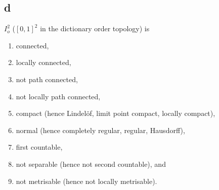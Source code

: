 
\subsection*{d}
  $I_o^2$ ($[0,1]^2$ in the dictionary order topology) is
  \begin{enumerate}
  \item connected,
  \item locally connected,
  \item not path connected,
  \item not locally path connected,
  \item compact (hence Lindel\"of, limit point compact, locally compact),
  \item normal (hence completely regular, regular, Hausdorff),
  \item first countable,
  \item not separable (hence not second countable), and
  \item not metrisable (hence not locally metrisable).
  \end{enumerate}

